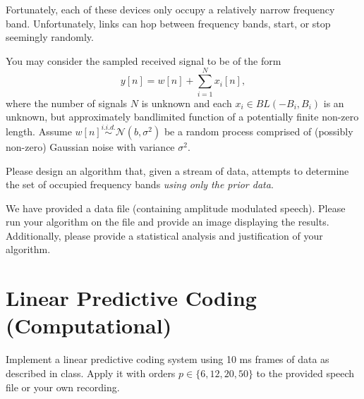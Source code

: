 \documentclass[12pt]{article}
\newcommand{\0}{\mathbf{0}}
\newcommand{\1}{\mathbf{1}}
\begin{document}
Fortunately, each of these devices only occupy a relatively narrow frequency band.
Unfortunately, links can hop between frequency bands, start, or stop seemingly randomly.

You may consider the sampled received signal to be of the form
\begin{equation}
    y[n] = w[n] + \sum_{i=1}^N x_i[n],
\end{equation}
where the number of signals $N$ is unknown and each $x_i \in BL(-B_i,B_i)$ is an unknown, but approximately bandlimited function of a potentially finite non-zero length.
Assume $w[n] \overset{i.i.d.}{\sim} \mathcal{N}(b,\sigma^2)$ be a random process comprised of (possibly non-zero) Gaussian noise with variance $\sigma^2$.

Please design an algorithm that, given a stream of data, attempts to determine the set of occupied frequency bands \textit{using only the prior data}.

We have provided a data file (containing amplitude modulated speech).
Please run your algorithm on the file and provide an image displaying the results.
Additionally, please provide a statistical analysis and justification of your algorithm.

\pagebreak
\section{Linear Predictive Coding (Computational)}
Implement a linear predictive coding system using 10 ms frames of data as described in class.
Apply it with orders $p \in \{6,12,20,50\}$ to the provided speech file or your own recording.
\end{document}
